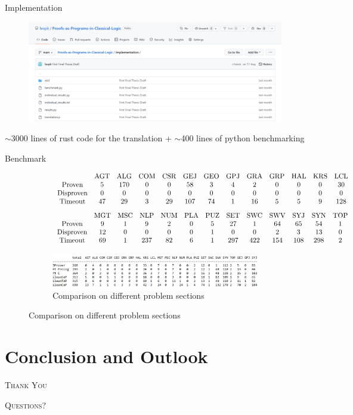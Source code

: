 \documentclass{cubeamer}
\begin{document}
	\begin{frame}{Implementation}
		\centering
		\begin{figure}
			\includegraphics[width=\textwidth]{implementation.png}
		\end{figure}
		$\sim$3000 lines of rust code for the translation + $\sim$400 lines of python benchmarking
	\end{frame}


	\begin{frame}{Benchmark}
		\begin{figure}
				\begin{subfigure}{\textwidth}
					\scriptsize
					$$\begin{array}{*{13}c}
					&\text{AGT}&\text{ALG}&\text{COM}&\text{CSR}&\text{GEJ}&\text{GEO}&\text{GPJ}&\text{GRA}&\text{GRP}&\text{HAL}&\text{KRS}&\text{LCL}\\
					\text{Proven}&5&170&0&0&58&3&4&2&0&0&0&30\\
					\text{Disproven}&0&0&0&0&0&0&0&0&0&0&0&0\\
					\text{Timeout}&47&29&3&29&107&74&1&16&5&5&9&128
				\end{array}$$
				$$\begin{array}{*{13}c}
					&\text{MGT}&\text{MSC}&\text{NLP}&\text{NUM}&\text{PLA}&\text{PUZ}&\text{SET}&\text{SWC}&\text{SWV}&\text{SYJ}&\text{SYN}&\text{TOP}\\
					\text{Proven}&9&1&9&2&0&5&27&1&64&65&54&1\\
					\text{Disproven}&12&0&0&0&0&1&0&0&2&3&13&0\\
					\text{Timeout}&69&1&237&82&6&1&297&422&154&108&298&2
				\end{array}$$
				\end{subfigure}
				\begin{subfigure}{0.9\textwidth}
					\includegraphics[width=\textwidth]{comparison.png}
					\caption{Comparison on different problem sections}
				\end{subfigure}
		\end{figure}
	\end{frame}
	
	\section{Conclusion and Outlook}
	
\begin{frame}[standout]
	\Huge\textsc{Thank You}
	
	\vfill
	
	\LARGE\textsc{Questions?}
\end{frame}
	
\end{document}
